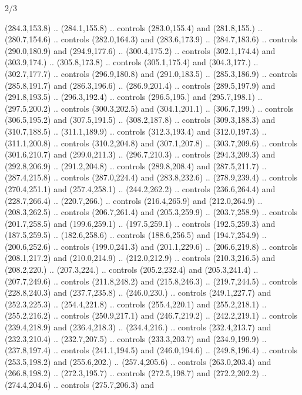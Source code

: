 \begin{flagdescription}{2/3}
\begin{scope}[xshift=0.5\flaglength,fill=white]
\begin{scope}[scale=0.00038\flagwidth,yshift=38.5mm,xshift=-705mm]
\begin{scope}[y=0.1mm, x=0.1mm, yscale=-1, xscale=1]
\begin{scope}[cm={{18.0964,0.0,0.0,17.21363,(246.63518,-8836.1551)}}]
  (284.3,153.8) .. (284.1,155.8) .. controls (283.0,155.4) and
  (281.8,155.) .. (280.7,154.6) .. controls (282.0,164.3) and
  (283.6,173.9) .. (284.7,183.6) .. controls (290.0,180.9) and
  (294.9,177.6) .. (300.4,175.2) .. controls (302.1,174.4) and
  (303.9,174.) .. (305.8,173.8) .. controls (305.1,175.4) and
  (304.3,177.) .. (302.7,177.7) .. controls (296.9,180.8) and
  (291.0,183.5) .. (285.3,186.9) .. controls (285.8,191.7) and
  (286.3,196.6) .. (286.9,201.4) .. controls (289.5,197.9) and
  (291.8,193.5) .. (296.3,192.4) .. controls (296.5,195.) and
  (295.7,198.1) .. (297.5,200.2) .. controls (300.3,202.5) and
  (304.1,201.1) .. (306.7,199.) .. controls (306.5,195.2) and
  (307.5,191.5) .. (308.2,187.8) .. controls (309.3,188.3) and
  (310.7,188.5) .. (311.1,189.9) .. controls (312.3,193.4) and
  (312.0,197.3) .. (311.1,200.8) .. controls (310.2,204.8) and
  (307.1,207.8) .. (303.7,209.6) .. controls (301.6,210.7) and
  (299.0,211.3) .. (296.7,210.3) .. controls (294.3,209.3) and
  (292.8,206.9) .. (291.2,204.8) .. controls (289.8,208.4) and
  (287.5,211.7) .. (287.4,215.8) .. controls (287.0,224.4) and
  (283.8,232.6) .. (278.9,239.4) .. controls (270.4,251.1) and
  (257.4,258.1) .. (244.2,262.2) .. controls (236.6,264.4) and
  (228.7,266.4) .. (220.7,266.) .. controls (216.4,265.9) and
  (212.0,264.9) .. (208.3,262.5) .. controls (206.7,261.4) and
  (205.3,259.9) .. (203.7,258.9) .. controls (201.7,258.5) and
  (199.6,259.1) .. (197.5,259.1) .. controls (192.5,259.3) and
  (187.5,259.5) .. (182.6,258.6) .. controls (188.6,256.5) and
  (194.7,254.9) .. (200.6,252.6) .. controls (199.0,241.3) and
  (201.1,229.6) .. (206.6,219.8) .. controls (208.1,217.2) and
  (210.0,214.9) .. (212.0,212.9) .. controls (210.3,216.5) and
  (208.2,220.) .. (207.3,224.) .. controls (205.2,232.4) and
  (205.3,241.4) .. (207.7,249.6) .. controls (211.8,248.2) and
  (215.8,246.3) .. (219.7,244.5) .. controls (228.8,240.3) and
  (237.7,235.8) .. (246.0,230.) .. controls (249.1,227.7) and
  (252.3,225.3) .. (254.4,221.8) .. controls (255.4,220.1) and
  (255.2,218.1) .. (255.2,216.2) .. controls (250.9,217.1) and
  (246.7,219.2) .. (242.2,219.1) .. controls (239.4,218.9) and
  (236.4,218.3) .. (234.4,216.) .. controls (232.4,213.7) and
  (232.3,210.4) .. (232.7,207.5) .. controls (233.3,203.7) and
  (234.9,199.9) .. (237.8,197.4) .. controls (241.1,194.5) and
  (246.0,194.6) .. (249.8,196.4) .. controls (253.5,198.2) and
  (255.6,202.) .. (257.4,205.6) .. controls (263.0,203.4) and
  (266.8,198.2) .. (272.3,195.7) .. controls (272.5,198.7) and
  (272.2,202.2) .. (274.4,204.6) .. controls (275.7,206.3) and

\end{scope}
\end{scope}
\end{scope}
\end{scope}
\end{flagdescription}
